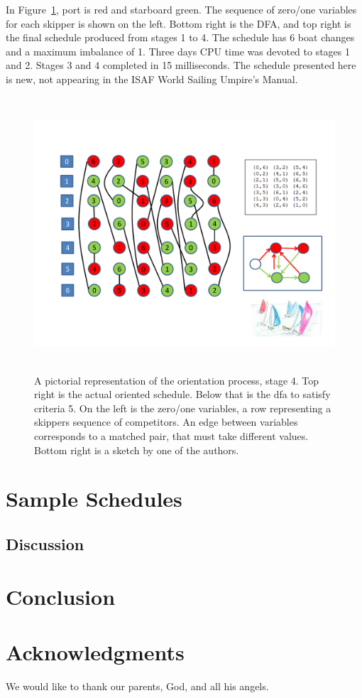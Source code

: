 \documentclass{llncs}
\begin{document}
In Figure~\ref{oriented}, port is red and starboard green. The sequence of
zero/one variables for each skipper is shown on the left. Bottom right is the
DFA, and top right is the final schedule produced from stages 1 to 4. The
schedule has 6 boat changes and a maximum imbalance of 1. Three days CPU time
was devoted to stages 1 and 2. Stages 3 and 4 completed in 15 milliseconds. The
schedule presented here is new, not appearing in the ISAF World Sailing
Umpire's Manual.

\begin{figure}[tb]
\centering
\includegraphics[height=10.2cm,width=13.2cm]{oriented.pdf}
\caption{A pictorial representation of the orientation process, stage 4. Top
right is the actual oriented schedule. Below that is the dfa to satisfy
criteria 5. On the left is the zero/one variables, a row representing a
skippers sequence of competitors. An edge between variables corresponds to a
matched pair, that must take different values. Bottom right is a sketch by one
of the authors.}
\label{oriented}
\end{figure}

\section{Sample Schedules}

\subsection{Discussion}

\section{Conclusion}

\section*{Acknowledgments}
We would like to thank our parents, God, and all his angels.



\end{document}
